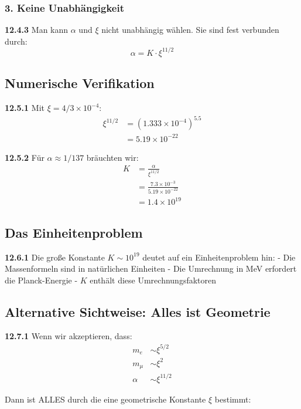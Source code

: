 \documentclass[12pt,a4paper]{article}
\begin{document}
\subsubsection{3. Keine Unabhängigkeit}
\noindent \textbf{12.4.3} Man kann $\alpha$ und $\xi$ nicht unabhängig wählen. Sie sind fest verbunden durch:
\begin{equation}
	\alpha = K \cdot \xi^{11/2}
\end{equation}

\subsection{Numerische Verifikation}

\noindent \textbf{12.5.1} Mit $\xi = 4/3 \times 10^{-4}$:
\begin{align}
	\xi^{11/2} &= (1.333 \times 10^{-4})^{5.5} \\
	&= 5.19 \times 10^{-22}
\end{align}

\noindent \textbf{12.5.2} Für $\alpha \approx 1/137$ bräuchten wir:
\begin{align}
	K &= \frac{\alpha}{\xi^{11/2}} \\
	&= \frac{7.3 \times 10^{-3}}{5.19 \times 10^{-22}} \\
	&= 1.4 \times 10^{19}
\end{align}

\subsection{Das Einheitenproblem}

\noindent \textbf{12.6.1} Die große Konstante $K \sim 10^{19}$ deutet auf ein Einheitenproblem hin:
- Die Massenformeln sind in natürlichen Einheiten
- Die Umrechnung in MeV erfordert die Planck-Energie
- $K$ enthält diese Umrechnungsfaktoren

\subsection{Alternative Sichtweise: Alles ist Geometrie}

\noindent \textbf{12.7.1} Wenn wir akzeptieren, dass:
\begin{align}
	m_e &\sim \xi^{5/2} \\
	m_\mu &\sim \xi^2 \\
	\alpha &\sim \xi^{11/2}
\end{align}

Dann ist ALLES durch die eine geometrische Konstante $\xi$ bestimmt:
\end{document}

